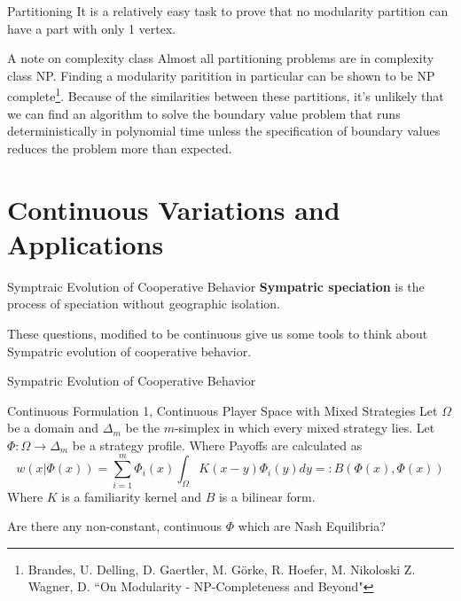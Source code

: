 \documentclass{beamer}
\begin{document}
\begin{frame}{Partitioning}
It is a relatively easy task to prove that no modularity partition can have a part with only 1 vertex. 
\begin{figure}
\end{figure}
\end{frame}
\begin{frame}
	{A note on complexity class}
	Almost all partitioning problems are in complexity class NP. Finding a modularity paritition in particular can be shown to be NP complete\footnote{Brandes, U. Delling, D. Gaertler, M. G\"orke, R. Hoefer, M. Nikoloski Z. Wagner, D. ``On Modularity - NP-Completeness and Beyond"}. Because of the similarities between these partitions, it's unlikely that we can find an algorithm to solve the boundary value problem that runs deterministically in polynomial time unless the specification of boundary values reduces the problem more than expected. 
\end{frame}
\section{Continuous Variations and Applications}
\begin{frame}{Symptraic Evolution of Cooperative Behavior}
	\textbf{Sympatric speciation} is the process of speciation without geographic isolation. 
	
	These questions, modified to be continuous give us some tools to think about Sympatric evolution of cooperative behavior. 
\end{frame}

\begin{frame}{Sympatric Evolution of Cooperative Behavior}
	\begin{block}{Continuous Formulation 1, Continuous Player Space with Mixed Strategies}
		Let $\Omega$ be a domain and $\Delta_m$ be the $m$-simplex in which every mixed strategy lies. Let $\Phi:\Omega \rightarrow\Delta_m$ be a strategy profile. Where Payoffs are calculated as 
		\begin{equation}
			w(x|\Phi(x))=\sum_{i=1}^m \Phi_i(x)\int_\Omega K(x-y)\Phi_i(y)dy =:B(\Phi(x),\Phi(x)) 
		\end{equation} 
		Where $K$ is a familiarity kernel and $B$ is a bilinear form. 
	\end{block}
	Are there any non-constant, continuous $\Phi$ which are Nash Equilibria? 
\end{frame}
\end{document}
